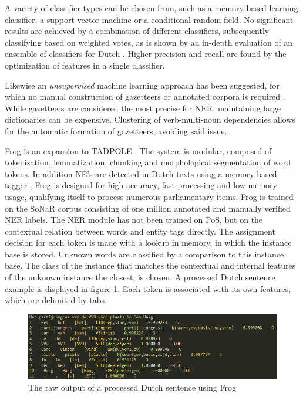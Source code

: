 A variety of classifier types can be chosen from, such as a memory-based learning classifier, a support-vector machine or a conditional random field.
No significant results are achieved by a combination of different classifiers, subsequently classifying based on weighted votes, as is shown by an in-depth evaluation of an ensemble of classifiers for Dutch  \cite{desmet2014fine}. Higher precision and recall are found by the optimization of features in a single classifier.

Likewise an \emph{unsupervised} machine learning approach has been suggested, for which no manual construction of gazetteers or annotated corpora is required \cite{kazama2008inducing}. While gazetteers are considered the most precise for NER, maintaining large dictionaries can be expensive. Clustering of verb-multi-noun dependencies allows for the automatic formation of gazetteers, avoiding said issue.

Frog is an expansion to TADPOLE \cite{bosch2007efficient}. The system is modular, composed of tokenization, lemmatization, chunking and morphological segmentation of word tokens. In addition NE's are detected in Dutch texts using a memory-based tagger \cite{daelemans2010mbt}. Frog is designed for high accuracy, fast processing and low memory usage, qualifying itself to process numerous parliamentary items. Frog is trained on the SoNaR corpus \cite{oostdijk2008d} consisting of one million annotated and manually verified NER labels. The NER module has not been trained on PoS, but on the contextual relation between words and entity tags directly.  The assignment decision for each token is made with a lookup in memory, in which the instance base is stored. Unknown words are classified by a comparison to this instance base. The class of the instance that matches the contextual and internal features of the unknown instance the closest, is chosen. A processed Dutch sentence example is displayed in figure \ref{fig:frog_out}. Each token is associated with its own features, which are delimited by tabs.

\begin{figure}
    \centering
    \includegraphics[scale=0.7]{fig/frog_output}
    \caption{The raw output of a processed Dutch sentence using Frog}
    \label{fig:frog_out}
\end{figure}





